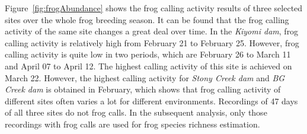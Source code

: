 Figure~\ref{fig:frogAbundance} shows the frog calling activity results of three selected sites over the whole frog breeding season. It can be found that the frog calling activity of the same site changes a great deal over time. In the \textit{Kiyomi dam}, frog calling activity is relatively high from February 21 to February 25. However, frog calling activity is quite low in two periods, which are February 26 to March 11 and April 07 to April 12. The highest calling activity of this site is achieved on March 22. However, the highest calling activity for \textit{Stony Creek dam} and \textit{BG Creek dam} is obtained in February, which shows that frog calling activity of different sites often varies a lot for different environments. Recordings of 47 days of all three sites do not frog calls. In the subsequent analysis, only those recordings with frog calls are used for frog species richness estimation. 

